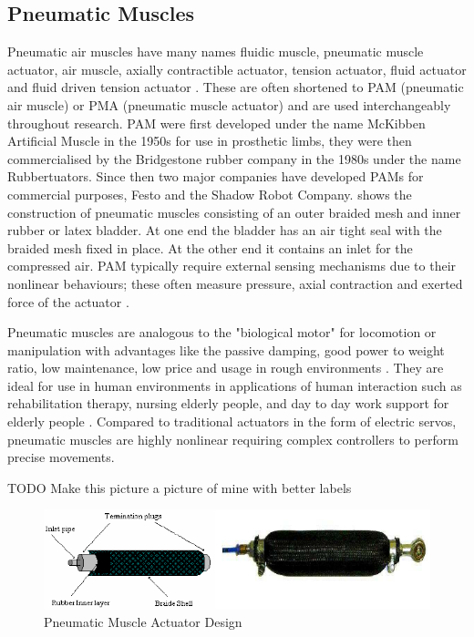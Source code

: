 \documentclass[11pt,a4paper]{article}
\begin{document}
\subsection{Pneumatic Muscles}
\label{sub:pneumatic_muscles}
Pneumatic air muscles have many names fluidic muscle, pneumatic muscle actuator, air muscle, axially contractible actuator, tension actuator, fluid actuator and fluid driven tension actuator \cite{najmuddin_mustaffa_2017} \cite{lau_chai_2012}. These are often shortened to PAM (pneumatic air muscle) or PMA (pneumatic muscle actuator) and are used interchangeably throughout research. PAM were first developed under the name McKibben Artificial Muscle in the 1950s for use in prosthetic limbs, they were then commercialised by the Bridgestone rubber company in the 1980s under the name Rubbertuators. Since then two major companies have developed PAMs for commercial purposes, Festo and the Shadow Robot Company.  shows the construction of pneumatic muscles consisting of an outer braided mesh and inner rubber or latex bladder. At one end the bladder has an air tight seal with the braided mesh fixed in place. At the other end it contains an inlet for the compressed air. PAM typically require external sensing mechanisms due to their nonlinear behaviours; these often measure pressure, axial contraction and exerted force of the actuator \cite{erin_pol_valle_park_2016}. \newline

Pneumatic muscles are analogous to the "biological motor" for locomotion or manipulation with advantages like the passive damping, good power to weight ratio, low maintenance, low price and usage in rough environments \cite{ranjan_upadhyay_kumar_dhyani_2012}. They are ideal for use in human environments in applications of human interaction such as rehabilitation therapy, nursing elderly people, and day to day work support for elderly people \cite{saga_nagase_saikawa_2006}. Compared to traditional actuators in the form of electric servos, pneumatic muscles are highly nonlinear requiring complex controllers to perform precise movements. \newline

TODO Make this picture a picture of mine with better labels
\begin{figure}[ht!]
    \centering
    \includegraphics[scale=0.6]{Pneumatic-Muscle-Actuator-Design.png}
    \caption{Pneumatic Muscle Actuator Design \cite{pneumatic_image}}
    \label{fig:pneumatic_design}
\end{figure}
\end{document}
